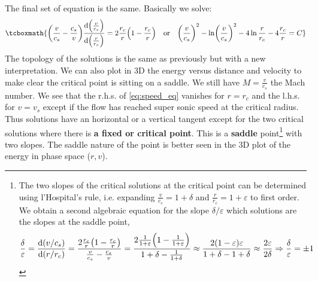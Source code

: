 \documentclass[10pt,a4paper,english,draft]{article}
\let\originalleft\left
\let\originalright\right
\renewcommand{\left}{\mathopen{}\mathclose\bgroup\originalleft}
\renewcommand{\right}{\aftergroup\egroup\originalright}
\begin{document}
The final set of equation is the same. Basically we solve:
\begin{equation}
  \tcboxmath{
    \left( \frac{v}{c_s} - \frac{c_s}{v} \right) \frac{\d \left( \frac{v}{c_s} \right) }{\d \left( \frac{r}{r_c } \right) } = 2 \frac{r_c}{r} \left( 1 - \frac{r_c }{r} \right)\quad \textrm{or} \quad
    \left( \frac{v}{c_s} \right)^2 - \ln \left( \frac{v}{c_s} \right)^2 - 4\ln \frac{r}{r_c }- 4 \frac{r_c}{r} = C
  }
\end{equation}
The topology of the solutions is the same as previously but with a new interpretation. We can also plot in 3D the energy versus distance and velocity to make clear the critical point is sitting on a saddle. We still have $M = \frac{v}{c_s}$ the Mach number. We see that the r.h.s. of \eqref{eq:speed_eq} vanishes for $r=r_c$ and the l.h.s. for $v=v_s$ except if the flow has reached super sonic speed at the critical radius. Thus solutions have an horizontal or a vertical tangent except for the two critical solutions where there is \textbf{a fixed or critical point}. This is a \textbf{saddle} point\footnote{The two slopes of the critical solutions at the critical point can be determined using l'Hospital's rule, i.e. expanding $\frac{v}{c_s} = 1 + \delta$ and $\frac{r}{r_c} = 1 + \varepsilon$ to first order. We obtain a second algebraic equation for the slope $\delta/\varepsilon$ which solutions are the slopes at the saddle point,
\begin{equation*}
  \frac{\delta}{\varepsilon} = \frac{\d (v/c_s)}{\d (r/r_c)} = \frac{2 \frac{r_c }{r}\left( 1 - \frac{r_c }{r} \right) }{\frac{v}{c_s} - \frac{c_s}{v}} = \frac{2 \frac{1}{1+\varepsilon} \left( 1 - \frac{1}{1+\varepsilon} \right) }{1 + \delta - \frac{1}{1+\delta}} \approx \frac{2(1-\varepsilon)\varepsilon}{1 + \delta - 1 + \delta} \approx \frac{2\varepsilon}{2\delta} \Rightarrow \frac{\delta}{\varepsilon} = \pm 1
\end{equation*}} with two slopes. The saddle nature of the point is better seen in the 3D plot of the energy in phase space ($r, v$).
\end{document}
